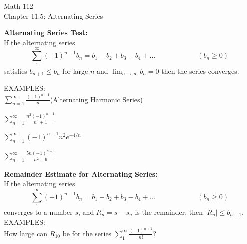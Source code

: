 \documentclass[11pt]{article}
\begin{document}
\begin{center}
\Large
\rm{Math 112}
\\
\rm{Chapter 11.5:  Alternating Series}
\\
\end{center}
\vspace{0.2in}

{\bf Alternating Series Test:}  \\

If the alternating series 
  \begin{displaymath}
    \sum_1^{\infty}(-1)^{n-1}b_n = b_1 - b_2 + b_3 - b_4 + ... \hspace{1in} (b_n\geq 0)
  \end{displaymath}
  satisfies $b_{n+1}\leq b_n $ for large $n$ and $\lim_{n\to \infty}b_n = 0$
  then the series converges.\\

  \vspace{0.2in}

 EXAMPLES:\\

$\sum_{n=1}^{\infty} \frac{(-1)^{n-1}}{n}$\quad (Alternating Harmonic Series)

\pagebreak

$\sum_{n=1}^{\infty} \frac{n^2(-1)^{n-1}}{n^3+1}$


\vspace{2.5in}

$\sum_{n=1}^{\infty} (-1)^{n+1}n^2e^{-4/n}$

\vspace{2.5in}

$\sum_{n=1}^{\infty} \frac{5n(-1)^{n-1}}{n^2+9}$

\pagebreak

{\bf Remainder Estimate for Alternating Series:}  \\

If the alternating series
  \begin{displaymath}
    \sum_1^{\infty}(-1)^{n-1}b_n = b_1 - b_2 + b_3 - b_4 + ... \hspace{1in} (b_n\geq 0)
  \end{displaymath}
converges to a number $s$, and $R_n= s-s_n$ is the remainder, then $|R_n|\leq b_{n+1}$.\\

EXAMPLES: \\

How large can $R_{10}$ be for the series $\sum_1^{\infty}\frac{(-1)^{n+1}}{n!}$?
\end{document}
